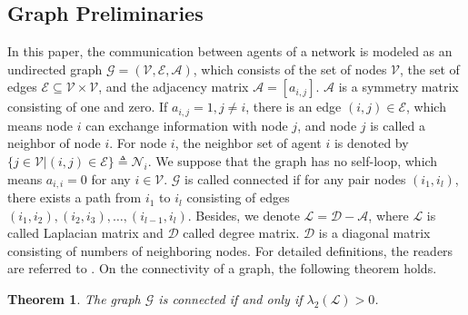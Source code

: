 \documentclass[10pt,journal,final]{IEEEtran}
\theoremstyle{plain}
\newtheorem{theorem}{Theorem}[section]
\theoremstyle{definition}
\theoremstyle{remark}
\begin{document}
\subsection{Graph Preliminaries}
In this paper, the communication between agents of a network is modeled as an undirected graph $\mathcal{G=(V,E,A)}$, which consists of  the set of  nodes $\mathcal{V}$, the set of edges $\mathcal{E}\subseteq \mathcal{V}\times \mathcal{V}$, and the adjacency matrix $\mathcal{A}=[a_{i,j}]$.  $\mathcal{A}$ is a symmetry matrix consisting of one and zero.
If $a_{i,j}=1,j\neq i$, there is an edge $(i,j)\in \mathcal{E}$, which means node $i$ can exchange information with node $j$, and node $j$ is called a  neighbor of node $i$. For node $i$, the neighbor set of agent $i$ is denoted by $\{j\in\mathcal{V}|(i,j)\in \mathcal{E}\}\triangleq\mathcal{N}_{i}$.
We suppose that the graph has no self-loop, which means $a_{i,i}=0$ for any $i\in\mathcal{V}$.
$\mathcal{G}$ is called connected if for any pair nodes $(i_{1},i_{l})$, there exists a   path from $i_{1}$ to $i_{l}$ consisting of edges $(i_{1},i_{2}),(i_{2},i_{3}),\ldots,(i_{l-1},i_{l})$. Besides, we denote $\mathcal{L}=\mathcal{D}-\mathcal{A}$, where $\mathcal{L}$ is called Laplacian matrix and $\mathcal{D}$ called degree matrix. $\mathcal{D}$ is a diagonal matrix consisting of numbers of neighboring nodes. For detailed definitions, the readers are referred to \cite{Mesbahi2010Graph}.
On the connectivity of a graph, the following theorem holds.
\begin{theorem}\cite{Mesbahi2010Graph}
	The graph $\mathcal{G}$ is connected if and only if $\lambda_{2}(\mathcal{L})>0$.
\end{theorem}
\end{document}
